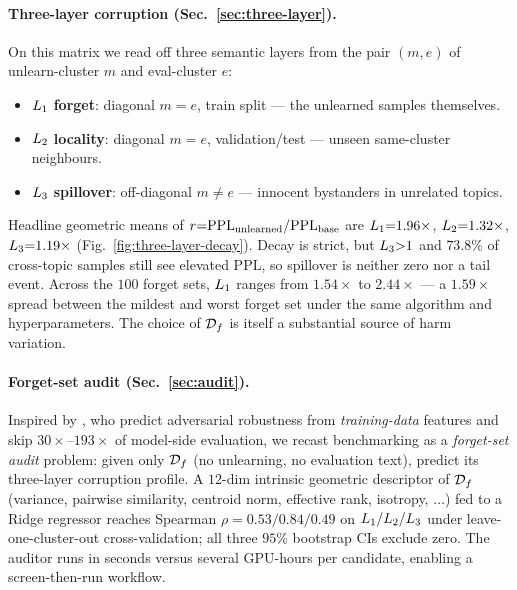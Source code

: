\paragraph{Three-layer corruption (Sec.~\ref{sec:three-layer}).} On this matrix we read off three semantic layers from the pair $(m,e)$ of unlearn-cluster $m$ and eval-cluster $e$:
\begin{itemize}
    \setlength\itemsep{0.2em}
    \item $L_1$ \textbf{forget}: diagonal $m{=}e$, train split --- the unlearned samples themselves.
    \item $L_2$ \textbf{locality}: diagonal $m{=}e$, validation/test --- unseen same-cluster neighbours.
    \item $L_3$ \textbf{spillover}: off-diagonal $m{\neq}e$ --- innocent bystanders in unrelated topics.
\end{itemize}
Headline geometric means of $r{=}\mathrm{PPL}_{\text{unlearned}}/\mathrm{PPL}_{\text{base}}$ are $L_1{=}1.96\times$, $L_2{=}1.32\times$, $L_3{=}1.19\times$ (Fig.~\ref{fig:three-layer-decay}). Decay is strict, but $L_3{>}1$ and $73.8\%$ of cross-topic samples still see elevated PPL, so spillover is neither zero nor a tail event. Across the $100$ forget sets, $L_1$ ranges from $1.54\times$ to $2.44\times$ --- a $1.59\times$ spread between the mildest and worst forget set under the same algorithm and hyperparameters. The choice of $\mathcal{D}_f$ is itself a substantial source of harm variation.

\paragraph{Forget-set audit (Sec.~\ref{sec:audit}).} Inspired by \citet{dang2024curious}, who predict adversarial robustness from \emph{training-data} features and skip $30\!\times\!\text{--}\!193\times$ of model-side evaluation, we recast benchmarking as a \emph{forget-set audit} problem: given only $\mathcal{D}_f$ (no unlearning, no evaluation text), predict its three-layer corruption profile. A $12$-dim intrinsic geometric descriptor of $\mathcal{D}_f$ (variance, pairwise similarity, centroid norm, effective rank, isotropy, $\ldots$) fed to a Ridge regressor reaches Spearman $\rho{=}0.53/0.84/0.49$ on $L_1/L_2/L_3$ under leave-one-cluster-out cross-validation; all three $95\%$ bootstrap CIs exclude zero. The auditor runs in seconds versus several GPU-hours per candidate, enabling a screen-then-run workflow.

